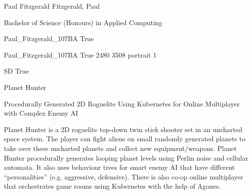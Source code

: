 \documentclass[twoside]{report}
\begin{document}
\begingroup{}\relax



\def\Key{Paul_Fitzgerald_107BA}

{Paul Fitzgerald}
{Fitzgerald, Paul}

{Bachelor of Science (Honours) in Applied Computing}

{Paul_Fitzgerald_107BA}
{True}

{Paul_Fitzgerald_107BA}
{True}
{2480}
{3508}
{portrait}
{1}

{SD}
{True}

{Planet Hunter}

{Procedurally Generated 2D Roguelite Using Kubernetes for Online Multiplayer with Complex Enemy AI}

{Planet Hunter is a 2D roguelite top-down twin stick shooter set in an uncharted space system. The player can fight aliens on small randomly generated planets to take over these uncharted planets and collect new equipment/weapons. Planet Hunter procedurally generates looping planet levels using Perlin noise and cellular automata. It also uses behaviour trees for smart enemy AI that have different \textquotedblleft{}personalities\textquotedblright{} (e.g. aggressive, defensive). There is also co-op online multiplayer that orchestrates game rooms using Kubernetes with the help of Agones.}
\end{document}
